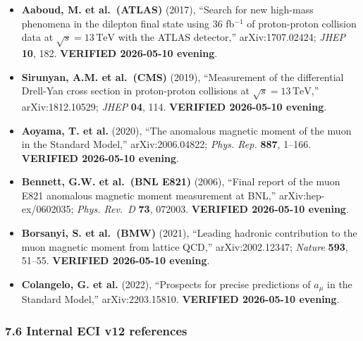 \documentclass[
  11pt,
  a4paper,
]{article}
\begin{document}
\begin{itemize}
\item
  \textbf{Aaboud, M. et al.~(ATLAS)} (2017), ``Search for new high-mass phenomena in the dilepton final state using 36 fb\(^{-1}\) of proton-proton collision data at \(\sqrt s = 13\,\mathrm{TeV}\) with the ATLAS detector,'' arXiv:1707.02424; \emph{JHEP} \textbf{10}, 182. \textbf{VERIFIED 2026-05-10 evening}.
\item
  \textbf{Sirunyan, A.M. et al.~(CMS)} (2019), ``Measurement of the differential Drell-Yan cross section in proton-proton collisions at \(\sqrt s = 13\,\mathrm{TeV}\),'' arXiv:1812.10529; \emph{JHEP} \textbf{04}, 114. \textbf{VERIFIED 2026-05-10 evening}.
\item
  \textbf{Aoyama, T. et al.} (2020), ``The anomalous magnetic moment of the muon in the Standard Model,'' arXiv:2006.04822; \emph{Phys. Rep.} \textbf{887}, 1--166. \textbf{VERIFIED 2026-05-10 evening}.
\item
  \textbf{Bennett, G.W. et al.~(BNL E821)} (2006), ``Final report of the muon E821 anomalous magnetic moment measurement at BNL,'' arXiv:hep-ex/0602035; \emph{Phys. Rev.~D} \textbf{73}, 072003. \textbf{VERIFIED 2026-05-10 evening}.
\item
  \textbf{Borsanyi, S. et al.~(BMW)} (2021), ``Leading hadronic contribution to the muon magnetic moment from lattice QCD,'' arXiv:2002.12347; \emph{Nature} \textbf{593}, 51--55. \textbf{VERIFIED 2026-05-10 evening}.
\item
  \textbf{Colangelo, G. et al.} (2022), ``Prospects for precise predictions of \(a_\mu\) in the Standard Model,'' arXiv:2203.15810. \textbf{VERIFIED 2026-05-10 evening}.
\end{itemize}

\hypertarget{internal-eci-v12-references}{%
\subsubsection{7.6 Internal ECI v12 references}\label{internal-eci-v12-references}}
\end{document}
